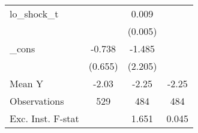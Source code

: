 {\begin{tabular}{l*{3}{c}}
\addlinespace
lo\_shock\_t  &                     &       0.009\sym{*}  &                     \\
            &                     &     (0.005)         &                     \\
\addlinespace
\_cons      &      -0.738         &      -1.485         &                     \\
            &     (0.655)         &     (2.205)         &                     \\
\midrule
Mean Y      &       -2.03         &       -2.25         &       -2.25         \\
Observations&         529         &         484         &         484         \\
Exc. Inst. F-stat&                     &       1.651         &       0.045         \\
\bottomrule
\end{tabular}
}
